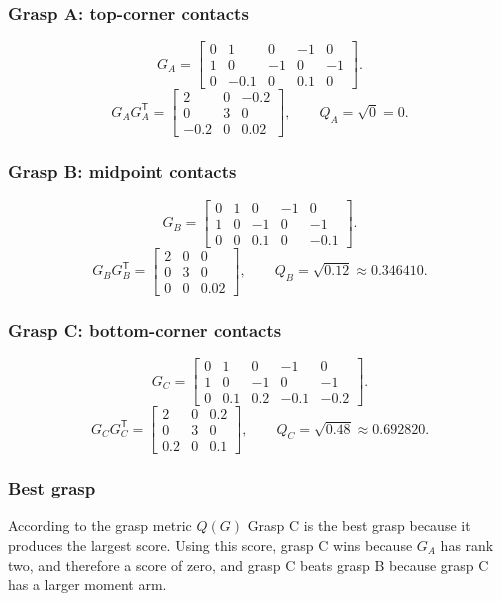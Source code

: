 \documentclass[11pt]{article}
\begin{document}
\subsubsection*{Grasp A: top-corner contacts}
\[
G_A = \begin{bmatrix}
  0 & 1 & 0 & -1 & 0 \\
  1 & 0 & -1 & 0 & -1 \\
  0 & -0.1 & 0 & 0.1 & 0
\end{bmatrix}.
\]
\[
G_AG_A^{\mathsf T} = \begin{bmatrix}
  2 & 0 & -0.2 \\ 0 & 3 & 0 \\ -0.2 & 0 & 0.02
\end{bmatrix},
\qquad Q_A = \sqrt{0}=0.
\]

\subsubsection*{Grasp B: midpoint contacts}
\[
G_B = \begin{bmatrix}
  0 & 1 & 0 & -1 & 0 \\
  1 & 0 & -1 & 0 & -1 \\
  0 & 0 & 0.1 & 0 & -0.1
\end{bmatrix}.
\]
\[
G_BG_B^{\mathsf T} = \begin{bmatrix}
  2 & 0 & 0 \\ 0 & 3 & 0 \\ 0 & 0 & 0.02
\end{bmatrix},
\qquad Q_B = \sqrt{0.12}\approx 0.346410.
\]

\subsubsection*{Grasp C: bottom-corner contacts}
\[
G_C = \begin{bmatrix}
  0 & 1 & 0 & -1 & 0 \\
  1 & 0 & -1 & 0 & -1 \\
  0 & 0.1 & 0.2 & -0.1 & -0.2
\end{bmatrix}.
\]
\[
G_CG_C^{\mathsf T} = \begin{bmatrix}
  2 & 0 & 0.2 \\ 0 & 3 & 0 \\ 0.2 & 0 & 0.1
\end{bmatrix},
\qquad Q_C = \sqrt{0.48}\approx 0.692820.
\]

\subsubsection*{Best grasp}
According to the grasp metric $Q(G)$ Grasp C is the best grasp because it produces the largest score. Using this score, grasp C wins because $G_A$ has rank two, and therefore a score of zero, and grasp C beats grasp B because grasp C has a larger moment arm.

\end{document}
